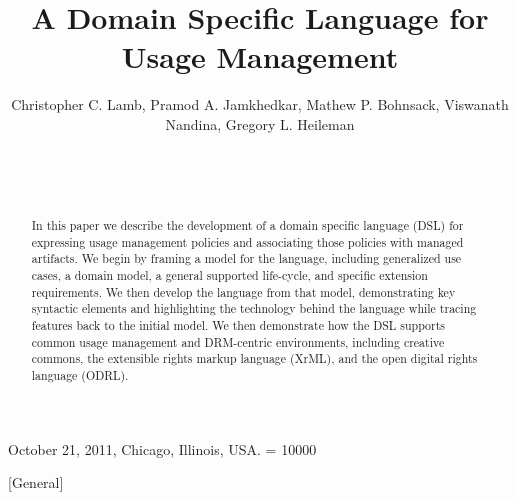 \documentclass[letterpaper]{sig-alternate}
\begin{document}
\title{A Domain Specific Language for Usage Management}


\author{
\alignauthor
Christopher C. Lamb, Pramod A. Jamkhedkar, Mathew P. Bohnsack, Viswanath Nandina, Gregory L. Heileman \\
       \\
       \\
       \\
}

 {October 21, 2011, Chicago, Illinois, USA.} 
\widowpenalty = 10000

\maketitle

\begin{abstract}
In this paper we describe the development of a domain specific language (DSL) for expressing usage management policies and associating those policies with managed artifacts.  We begin by framing a model for the language, including generalized use cases, a domain model, a general supported life-cycle, and specific extension requirements.  We then develop the language from that model, demonstrating key syntactic elements and highlighting the technology behind the language while tracing features back to the initial model.  We then demonstrate how the DSL supports common usage management and DRM-centric environments, including creative commons, the extensible rights markup language (XrML), and the open digital rights language (ODRL).
\end{abstract}

[General]






\end{document}
